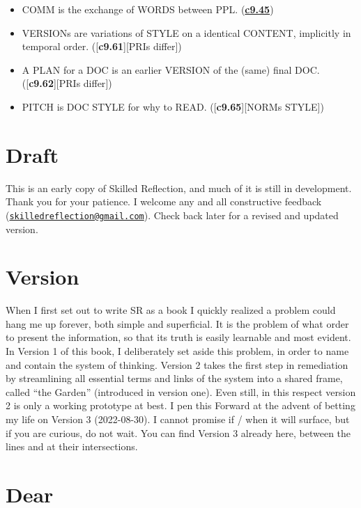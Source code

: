 \documentclass[
]{book}
\begin{document}
\begin{itemize}
\item
  COMM is the exchange of WORDS between PPL. (\protect\hyperlink{style}{\textbf{c9.45}})\\
\item
  VERSIONs are variations of STYLE on a identical CONTENT, implicitly in temporal order. ({[}\textbf{c9.61}{]}{[}PRIs differ{]})\\
\item
  A PLAN for a DOC is an earlier VERSION of the (same) final DOC. ({[}\textbf{c9.62}{]}{[}PRIs differ{]})\\
\item
  PITCH is DOC STYLE for why to READ. ({[}\textbf{c9.65}{]}{[}NORMs STYLE{]})
\end{itemize}

\hypertarget{draft}{%
\section{Draft}\label{draft}}

This is an early copy of Skilled Reflection, and much of it is still in development. Thank you for your patience. I welcome any and all constructive feedback (\href{mailto:skilledreflection@gmail.com}{\nolinkurl{skilledreflection@gmail.com}}). Check back later for a revised and updated version.

\hypertarget{version}{%
\section{Version}\label{version}}

When I first set out to write SR as a book I quickly realized a problem could hang me up forever, both simple and superficial.
It is the problem of what order to present the information, so that its truth is easily learnable and most evident.
In Version 1 of this book, I deliberately set aside this problem, in order to name and contain the system of thinking.
Version 2 takes the first step in remediation by streamlining all essential terms and links of the system into a shared frame, called ``the Garden'' (introduced in version one). Even still, in this respect version 2 is only a working prototype at best.
I pen this Forward at the advent of betting my life on Version 3 (2022-08-30). I cannot promise if / when it will surface, but if you are curious, do not wait. You can find Version 3 already here, between the lines and at their intersections.

\hypertarget{dear}{%
\section{Dear}\label{dear}}
\end{document}
